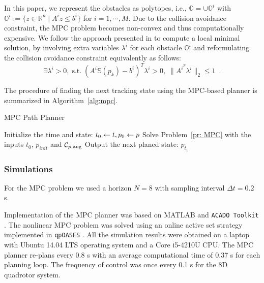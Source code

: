 %
\begin{remark}
In this paper, we represent the obstacles as polytopes, i.e., $\mathbb{O} = \cup \mathbb{O}^{i}$ with $\mathbb{O}^{i}:= \{z\in\mathbb{R}^{n} \mid A^{i}z\leq b^{i}\}$ for $i = 1,\cdots ,M$. Due to the collision avoidance constraint, the MPC problem becomes non-convex and thus computationally expensive. We follow the approach presented in \cite{Zhang2017} to compute a local minimal solution, by involving extra variables $\lambda^{i}$ for each obstacle $\mathbb{O}^{i}$ and reformulating the collision avoidance constraint equivalently as follows: 
%
\begin{equation}
\exists \lambda^{i} >0, \; \mbox{s.t.} \; (A^{i} \mathbb{S}(p_k) - b^{i})^{T}\lambda^{i}  > 0, \; \|A^{i^{T}}\lambda^{i}\|_2\leq 1\enspace .
\end{equation}
%
\end{remark}
%
The procedure of finding the next tracking state using the MPC-based planner is summarized in Algorithm~\ref{alg:mpc}.
%
\begin{algorithm}	
	\caption{MPC Path Planner}
	\label{alg:mpc}
	\begin{algorithmic}[1]
 		\STATE Initialize the time and state: $t_0 \leftarrow t, p_0 \leftarrow p$
			\STATE Solve Problem~\ref{pr: MPC} with the inputs $t_0$, $p_{init}$ and $\mathcal C_{p,\text{aug}}$
		\ENDIF
          \STATE Output the next planed state: $p_{t_1}$
	\end{algorithmic}
\end{algorithm}

\subsubsection{Simulations}






For the MPC problem we used a horizon $N=8$ with sampling interval $\Delta t = 0.2$ s.

Implementation of the MPC planner was based on MATLAB and \texttt{ACADO Toolkit} \cite{Houska2011a}. The nonlinear MPC problem was solved using an online active set strategy implemented in \texttt{qpOASES} \cite{Ferreau2014}. All the simulation results were obtained on a laptop with Ubuntu 14.04 LTS operating system and a Core i5-4210U CPU. The MPC planner re-plans every 0.8 s with an average computational time of 0.37 s for each planning loop. The frequency of control was once every 0.1 s for the 8D quadrotor system.

